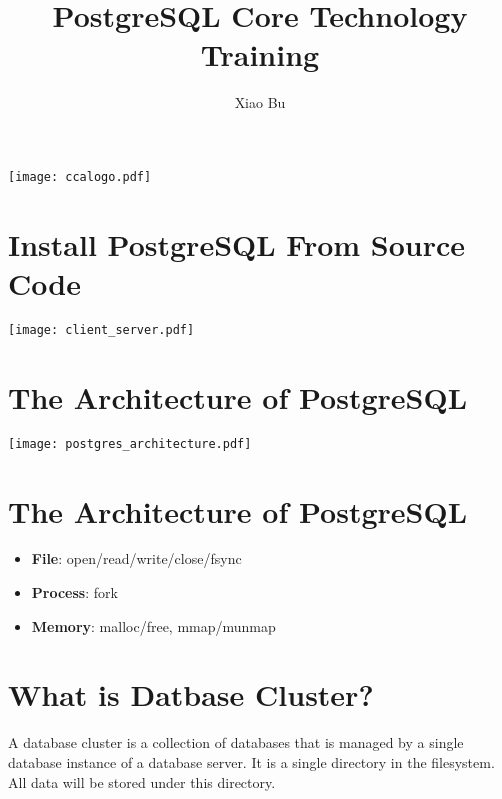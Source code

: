 \documentclass[en,hazy,blue,screen,14pt]{elegantnote}
\title{PostgreSQL Core Technology Training}
\author{Xiao Bu}
\institute{https://cherry-creek.net}
\begin{document}
\maketitle
\centerline{\texttt{[image: ccalogo.pdf]}}


\newpage
\section{Install PostgreSQL From Source Code}
\centerline{\texttt{[image: client\_server.pdf]}}


\newpage
\section{The Architecture of PostgreSQL}
\centerline{\texttt{[image: postgres\_architecture.pdf]}}

\newpage
\section{The Architecture of PostgreSQL}
\begin{itemize}
  \item \textbf{File}: open/read/write/close/fsync
  \item \textbf{Process}: fork
  \item \textbf{Memory}: malloc/free, mmap/munmap
\end{itemize}

\newpage
\section{What is Datbase Cluster?}

A database cluster is a collection of databases that is managed by a single database instance of a database server. It is a single directory in the filesystem. All data will be stored under this directory.
\end{document}
